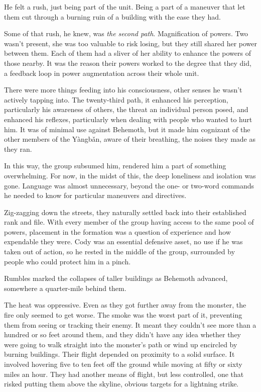 He felt a rush, just being part of the unit.  Being a part of a maneuver that let them cut through a burning ruin of a building with the ease they had.



Some of that rush, he knew, was \emph{the second path}.  Magnification of powers.  Two wasn't present, she was too valuable to risk losing, but they still shared her power between them.  Each of them had a sliver of her ability to enhance the powers of those nearby.  It was the reason their powers worked to the degree that they did, a feedback loop in power augmentation across their whole unit.



There were more things feeding into his consciousness, other senses he wasn't actively tapping into.  The twenty-third path, it enhanced his perception, particularly his awareness of others, the threat an individual person posed, and enhanced his reflexes, particularly when dealing with people who wanted to hurt him.  It was of minimal use against Behemoth, but it made him cognizant of the other members of the Y\`{a}ngb\v{a}n, aware of their breathing, the noises they made as they ran.



In this way, the group subsumed him, rendered him a part of something overwhelming.  For now, in the midst of this, the deep loneliness and isolation was gone.  Language was almost unnecessary, beyond the one- or two-word commands he needed to know for particular maneuvers and directives.



Zig-zagging down the streets, they naturally settled back into their established rank and file.  With every member of the group having access to the same pool of powers, placement in the formation was a question of experience and how expendable they were.  Cody was an essential defensive asset, no use if he was taken out of action, so he rested in the middle of the group, surrounded by people who could protect him in a pinch.



Rumbles marked the collapses of taller buildings as Behemoth advanced, somewhere a quarter-mile behind them.



The heat was oppressive.  Even as they got further away from the monster, the fire only seemed to get worse.  The smoke was the worst part of it, preventing them from seeing or tracking their enemy.  It meant they couldn't see more than a hundred or so feet around them, and they didn't have any idea whether they were going to walk straight into the monster's path or wind up encircled by burning buildings.  Their flight depended on proximity to a solid surface.  It involved hovering five to ten feet off the ground while moving at fifty or sixty miles an hour.  They had another means of flight, but less controlled, one that risked putting them above the skyline, obvious targets for a lightning strike.



